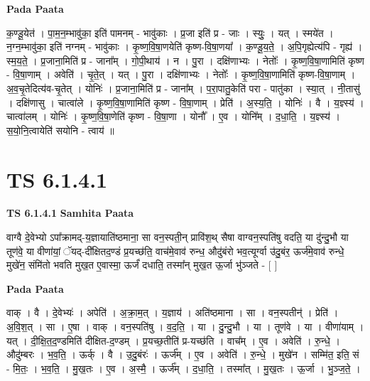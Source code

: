 \documentclass[17pt]{extarticle}
\begin{document}
\textbf{Pada Paata} \newline

क॒ण्डू॒येत॑ । पा॒म॒न॒म्भावु॑का॒ इति॑ पामनम् - भावु॑काः । प्र॒जा इति॑ प्र - जाः । स्युः॒ । यत् । स्मये॑त । न॒ग्न॒म्भावु॑का॒ इति॑ नग्नम् - भावु॑काः । कृ॒ष्ण॒वि॒षा॒णयेति॑ कृष्ण-वि॒षा॒णया᳚ । क॒ण्डू॒य॒ते॒ । अ॒पि॒गृह्येत्य॑पि - गृह्य॑ । स्म॒य॒ते॒ । प्र॒जाना॒मिति॑ प्र - जाना᳚म् । गो॒पी॒थाय॑ । न । पु॒रा । दक्षि॑णाभ्यः । नेतोः᳚ । कृ॒ष्ण॒वि॒षा॒णामिति॑ कृष्ण - वि॒षा॒णाम् । अवेति॑ । चृ॒ते॒त् । यत् । पु॒रा । दक्षि॑णाभ्यः । नेतोः᳚ । कृ॒ष्ण॒वि॒षा॒णामिति॑ कृष्ण-वि॒षा॒णाम् । अ॒व॒चृ॒तेदित्य॑व-चृ॒तेत् । योनिः॑ । प्र॒जाना॒मिति॑ प्र - जाना᳚म् । प॒रा॒पातु॒केति॑ परा - पातु॑का । स्या॒त् । नी॒तासु॑ । दक्षि॑णासु । चात्वा॑ले । कृ॒ष्ण॒वि॒षा॒णामिति॑ कृष्ण - वि॒षा॒णाम् । प्रेति॑ । अ॒स्य॒ति॒ । योनिः॑ । वै । य॒ज्ञ्स्य॑ । चात्वा॑लम् । योनिः॑ । कृ॒ष्ण॒वि॒षा॒णेति॑ कृष्ण - वि॒षा॒णा । योनौ᳚ । ए॒व । योनि᳚म् । द॒धा॒ति॒ । य॒ज्ञ्स्य॑ । स॒यो॒नि॒त्वायेति॑ सयोनि - त्वाय॑ ॥  \newline




\section*{ TS 6.1.4.1 }

\textbf{TS 6.1.4.1 } \newline
\textbf{Samhita Paata} \newline

वाग्वै दे॒वेभ्यो ऽपा᳚क्रामद्-य॒ज्ञायाति॑ष्ठमाना॒ सा वन॒स्पती॒न् प्रावि॑श॒थ् सैषा वाग्वन॒स्पति॑षु वदति॒ या दु॑न्दु॒भौ या तूण॑वे॒ या वीणा॑यां॒ ॅयद्-दी᳚क्षितद॒ण्डं प्र॒यच्छ॑ति॒ वाच॑मे॒वाव॑ रुन्ध॒ औदु॑बंरो भव॒त्यूर्ग्वा उ॑दु॒बंर॒ ऊर्ज॑मे॒वाव॑ रुन्धे॒ मुखे॑न॒ संमि॑तो भवति मुख॒त ए॒वास्मा॒ ऊर्जं॑ दधाति॒ तस्मा᳚न् मुख॒त ऊ॒र्जा भु॑ञ्जते - [  ] \newline

\textbf{Pada Paata} \newline

वाक् । वै । दे॒वेभ्यः॑ । अपेति॑ । अ॒क्रा॒म॒त् । य॒ज्ञाय॑ । अति॑ष्ठमाना । सा । वन॒स्पतीन्॑ । प्रेति॑ । अ॒वि॒श॒त् । सा । ए॒षा । वाक् । वन॒स्पति॑षु । व॒द॒ति॒ । या । दु॒न्दु॒भौ । या । तूण॑वे । या । वीणा॑याम् । यत् । दी॒क्षि॒त॒द॒ण्डमिति॑ दीक्षित-द॒ण्डम् । प्र॒यच्छ॒तीति॑ प्र-यच्छ॑ति । वाच᳚म् । ए॒व । अवेति॑ । रु॒न्धे॒ । औदु॑म्बरः । भ॒व॒ति॒ । ऊर्क् । वै । उ॒दु॒बंरः॑ । ऊर्ज᳚म् । ए॒व । अवेति॑ । रु॒न्धे॒ । मुखे॑न । सम्मि॑त॒ इति॒ सं - मि॒तः॒ । भ॒व॒ति॒ । मु॒ख॒तः । ए॒व । अ॒स्मै॒ । ऊर्ज᳚म् । द॒धा॒ति॒ । तस्मा᳚त् । मु॒ख॒तः । ऊ॒र्जा । भु॒ञ्ज॒ते॒ ।  \newline
\end{document}

